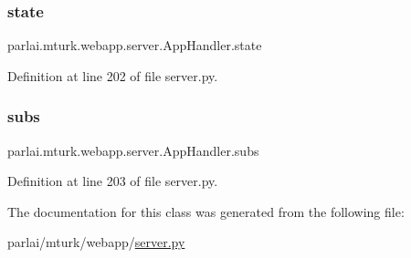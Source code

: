 \subsubsection{\texorpdfstring{state}{state}}
{\footnotesize\ttfamily parlai.\+mturk.\+webapp.\+server.\+App\+Handler.\+state}



Definition at line 202 of file server.\+py.

\mbox{\label{classparlai_1_1mturk_1_1webapp_1_1server_1_1AppHandler_a1c61eec19a28f77d438777da6e034cbc}} 
\subsubsection{\texorpdfstring{subs}{subs}}
{\footnotesize\ttfamily parlai.\+mturk.\+webapp.\+server.\+App\+Handler.\+subs}



Definition at line 203 of file server.\+py.



The documentation for this class was generated from the following file\+:\begin{DoxyCompactItemize}
\item 
parlai/mturk/webapp/\hyperlink{server_8py}{server.\+py}\end{DoxyCompactItemize}
